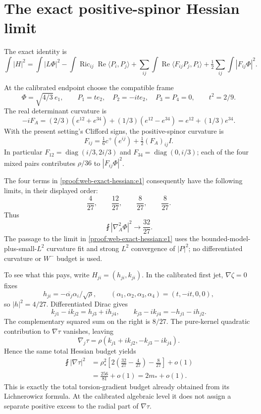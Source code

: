 \section{The exact positive-spinor Hessian limit}
\label{sec:web-exact-hessian}
The exact identity is \[
\int|H|^2=\int|L\Phi|^2
-\int\operatorname{Ric}_{ij}\operatorname{Re}\langle P_i,P_j\rangle
+\sum_{ij}\int\operatorname{Re}\langle F_{ij}P_j,P_i\rangle
+\tfrac12\sum_{ij}\int|F_{ij}\Phi|^2.
\tag{\thesection.1}\label{proof:web-exact-hessian:e1}
\]

At the calibrated endpoint choose the compatible frame \[
\Phi=\sqrt{4/3}\,e_1,\qquad
P_1=t e_2,\quad P_2=-it e_2,\quad P_3=P_4=0,
\qquad t^2=2/9.
\] The real determinant curvature is \[
-iF_A=(2/3)(e^{12}+e^{34})+(1/3)(e^{12}-e^{34})
=e^{12}+(1/3)e^{34}.
\] With the present setting's Clifford signs, the positive-spinor curvature is \[
F_{ij}=\tfrac16c^+(e^{ij})+\tfrac12(F_A)_{ij}I.
\] In particular \(F_{12}=\operatorname{diag}(i/3,2i/3)\) and \(F_{34}=\operatorname{diag}(0,i/3)\); each of the four mixed pairs contributes \(\rho/36\) to \(|F_{ij}\Phi|^2\).

The four terms in \eqref{proof:web-exact-hessian:e1} consequently have the following limits, in their displayed order: \[
\frac4{27},\qquad\frac{12}{27},\qquad
\frac8{27},\qquad\frac8{27}.
\] Thus \[
\boxed{\fint|\nabla_A^2\Phi|^2\longrightarrow\frac{32}{27}.}
\tag{\thesection.2}\label{proof:web-exact-hessian:e2}
\] The passage to the limit in \eqref{proof:web-exact-hessian:e1} uses the bounded-model-plus-small-\(L^2\) curvature fit and strong \(L^2\) convergence of \(|P|^2\); no differentiated curvature or \(W^-\) budget is used.

To see what this pays, write \(H_{ji}=(h_{ji},k_{ji})\). In the calibrated first jet, \(\nabla\zeta=0\) fixes \[
h_{ji}=-\overline{\alpha_j}\alpha_i/\sqrt\rho,
\qquad (\alpha_1,\alpha_2,\alpha_3,\alpha_4)=(t,-it,0,0),
\] so \(|h|^2=4/27\). Differentiated Dirac gives \[
k_{j1}-ik_{j2}=h_{j3}+ih_{j4},\qquad
k_{j3}-ik_{j4}=-h_{j1}-ih_{j2}.
\] The complementary squared sum on the right is \(8/27\). The pure-kernel quadratic contribution to \(\nabla\tau\) vanishes, leaving \[
\nabla_j\tau=\rho(k_{j1}+ik_{j2},-k_{j3}-ik_{j4}).
\] Hence the same total Hessian budget yields \[
\begin{aligned}
\fint|\nabla\tau|^2
&=\rho_*^2\left[2\left(\frac{32}{27}-\frac4{27}\right)-\frac8{27}\right]+o(1)\\
&=\frac{256}{81}+o(1)=2m_*+o(1).
\end{aligned}
\tag{\thesection.3}\label{proof:web-exact-hessian:e3}
\] This is exactly the total torsion-gradient budget already obtained from its Lichnerowicz formula. At the calibrated algebraic level it does not assign a separate positive excess to the radial part of \(\nabla\tau\).

